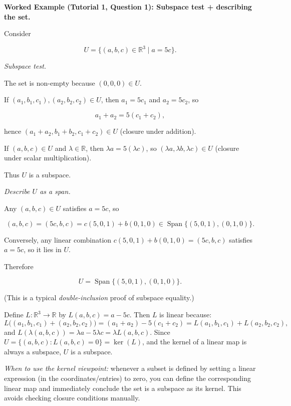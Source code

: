 \begin{examplebox}

\textbf{Worked Example (Tutorial 1, Question 1): Subspace test + describing the set.}

Consider

\[
U=\{(a,b,c)\in\mathbb{R}^3 \mid a=5c\}.
\]

\emph{Subspace test.}

The set is non-empty because $(0,0,0)\in U$.

If $(a_1,b_1,c_1),(a_2,b_2,c_2)\in U$, then $a_1=5c_1$ and $a_2=5c_2$, so

\[
a_1+a_2 = 5(c_1+c_2),
\]

hence $(a_1+a_2,b_1+b_2,c_1+c_2)\in U$ (closure under addition).

If $(a,b,c)\in U$ and $\lambda\in\mathbb{R}$, then $\lambda a=5(\lambda c)$, so $(\lambda a,\lambda b,\lambda c)\in U$ (closure under scalar multiplication).

Thus $U$ is a subspace.

\medskip

\emph{Describe $U$ as a span.}

Any $(a,b,c)\in U$ satisfies $a=5c$, so

\[
(a,b,c)=(5c,b,c)=c(5,0,1)+b(0,1,0)\in \operatorname{Span}\{(5,0,1),(0,1,0)\}.
\]

Conversely, any linear combination $c(5,0,1)+b(0,1,0)=(5c,b,c)$ satisfies $a=5c$, so it lies in $U$.

Therefore

\[
U=\operatorname{Span}\{(5,0,1),(0,1,0)\}.
\]

(This is a typical \emph{double-inclusion} proof of subspace equality.)

\end{examplebox}

\begin{extension}[title={Extension (Tutorial 1, Question 1, Method 2: Kernel viewpoint)}]
Define $L:\mathbb{R}^3\to\mathbb{R}$ by $L(a,b,c)=a-5c$.
Then $L$ is linear because:
\[
L\bigl((a_1,b_1,c_1)+(a_2,b_2,c_2)\bigr)=(a_1+a_2)-5(c_1+c_2)=L(a_1,b_1,c_1)+L(a_2,b_2,c_2),
\]
and $L(\lambda(a,b,c))=\lambda a-5\lambda c=\lambda L(a,b,c)$.
Since $U=\{(a,b,c):L(a,b,c)=0\}=\ker(L)$, and the kernel of a linear map is always a subspace, $U$ is a subspace.

\medskip
\emph{When to use the kernel viewpoint:} whenever a subset is defined by setting a linear expression (in the coordinates/entries) to zero, you can define the corresponding linear map and immediately conclude the set is a subspace as its kernel.  This avoids checking closure conditions manually.
\end{extension}

